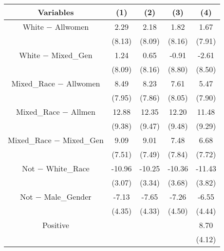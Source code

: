 \begin{table}[htbp]
    \begin{tabular}{c c c c c}
    \toprule
    \textbf{Variables} & \textbf{(1)} & \textbf{(2)} & \textbf{(3)}      & \textbf{(4)}     \\ 
\midrule
White $-$ Allwomen           &     2.29             &     2.18           &  1.82              &  1.67 \\
                                 &     (8.13)           &     (8.09)         &  (8.16)            &  (7.91) \\
White $-$ Mixed_{Gen}        &      1.24            &     0.65           &   -0.91            &  -2.61   \\
                                 &      (8.09)          &     (8.16)         &   (8.80)           &  (8.50) \\
Mixed_{Race} $-$ Allwomen        &      8.49            &    8.23            &  7.61              &  5.47   \\
                                 &      (7.95)          &    (7.86)          &  (8.05)            &  (7.90) \\
Mixed_{Race} $-$ Allmen          &      12.88           &    12.35           &  12.20             &  11.48 \\
                                 &      (9.38)          &    (9.47)          &  (9.48)            &  (9.29) \\
Mixed_{Race} $-$ Mixed_{Gen}     &      9.09           &     9.01            &  7.48              &  6.68  \\
                                 &      (7.51)         &     (7.49)          &  (7.84)            &  (7.72)  \\
Not $-$ White_{Race}         &     -10.96\sym{***} &    -10.25\sym{***}  & -10.36\sym{***}    &  -11.43\sym{***}  \\
                                 &      (3.07)         &     (3.34)          &  (3.68)            &  (3.82)  \\
Not $-$ Male_{Gender}            &     -7.13\sym{*}    &    -7.65\sym{*}     & -7.26\sym{*}       & -6.55   \\
                                 &      (4.35)         &     (4.33)          & (4.50)             &  (4.44)  \\
Positive                         &                     &                     &                    &  8.70\sym{**}  \\
                                 &                     &                     &                    &  (4.12)  \\

\end{tabular}
\end{table}
